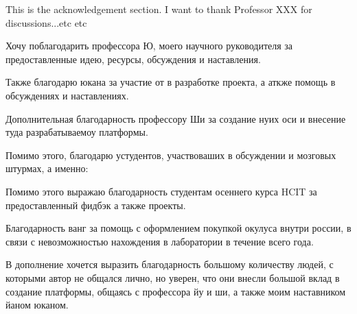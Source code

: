 \begin{acknowledgements}
  This is the acknowledgement section. I want to thank Professor XXX for discussions...etc etc
  
  Хочу поблагодарить профессора Ю, моего научного руководителя за предоставленные идею, ресурсы, обсуждения и наставления.
  
  Также благодарю юкана за участие от в разработке проекта, а аткже помощь в обсуждениях и наставлениях.
  
  Дополнительная благодарность профессору Ши за создание нуих оси и внесение туда разрабатываемоу платформы.
  
  Помимо этого, благодарю устудентов, участвоваших в обсуждении и мозговых штурмах, а именно:
  
  Помимо этого выражаю благодарность студентам осеннего курса HCIT за предоставленный фидбэк а также проекты.
  
  Благодарность ванг за помощь с оформлением покупкой окулуса внутри россии, в связи с невозможностью нахождения в лаборатории в течение всего года.
  
  В дополнение хочется выразить благодарность большому количеству людей, с которыми автор не общался лично, но уверен, что они внесли большой вклад в создание платформы, общаясь с профессора йу и ши, а также моим наставником йаном юканом.
  
  
  
  
  
\end{acknowledgements}
